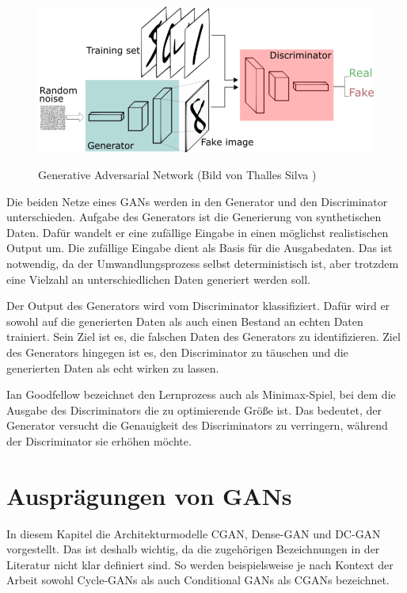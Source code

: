 \begin{figure}[H]
	\centering
	\includegraphics[width=12cm]{kapitel/2_stand_der_technik/img/GAN.png}
	\label{img:gan}
	\caption{Generative Adversarial Network (Bild von Thalles Silva \cite{img-gan})}
\end{figure}

Die beiden Netze eines \acrshort{GAN}s werden in den Generator und den Discriminator unterschieden.
Aufgabe des Generators ist die Generierung von synthetischen Daten.
Dafür wandelt er eine zufällige Eingabe in einen möglichst realistischen Output um.
Die zufällige Eingabe dient als Basis für die Ausgabedaten.
Das ist notwendig, da der Umwandlungsprozess selbst deterministisch ist, aber trotzdem eine Vielzahl an unterschiedlichen Daten generiert werden soll.
\newline

Der Output des Generators wird vom Discriminator klassifiziert.
Dafür wird er sowohl auf die generierten Daten als auch einen Bestand an echten Daten trainiert.
Sein Ziel ist es, die falschen Daten des Generators zu identifizieren.
Ziel des Generators hingegen ist es, den Discriminator zu täuschen und die generierten Daten als echt wirken zu lassen.
\newline

Ian Goodfellow bezeichnet den Lernprozess auch als Minimax-Spiel, bei dem die Ausgabe des Discriminators die zu optimierende Größe ist.
Das bedeutet, der Generator versucht die Genauigkeit des Discriminators zu verringern, während der Discriminator sie erhöhen möchte. \cite{gan-minimax}

\section{Ausprägungen von GANs}
In diesem Kapitel die Architekturmodelle CGAN, Dense-GAN und DC-GAN vorgestellt.
Das ist deshalb wichtig, da die zugehörigen Bezeichnungen in der Literatur nicht klar definiert sind.
So werden beispielsweise je nach Kontext der Arbeit sowohl Cycle-GANs als auch Conditional GANs als CGANs bezeichnet.

